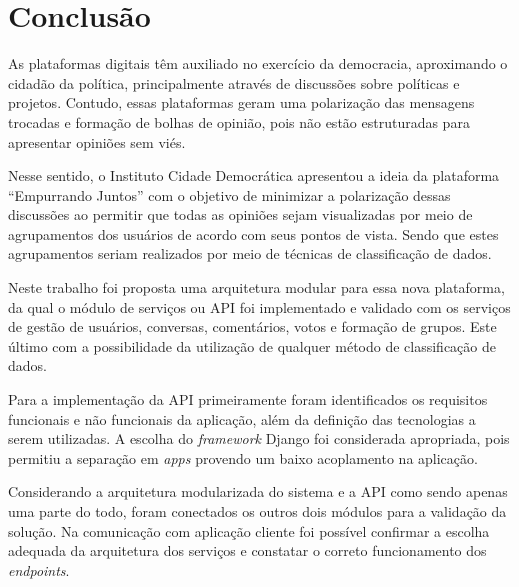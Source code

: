 \chapter{Conclusão} \label{cap:consideracoes_finais}

  As plataformas digitais têm auxiliado no exercício da democracia, aproximando o cidadão da política, principalmente
  através de discussões sobre políticas e projetos. Contudo,
  essas plataformas geram uma polarização das mensagens trocadas e formação de bolhas de opinião, 
  pois não estão estruturadas para apresentar opiniões sem viés.
  
  Nesse sentido, o Instituto Cidade Democrática apresentou a ideia da plataforma ``Empurrando Juntos'' com o objetivo
  de minimizar a polarização dessas discussões ao permitir que todas as opiniões sejam visualizadas por meio de agrupamentos
  dos usuários de acordo com seus pontos de vista. Sendo que estes agrupamentos seriam realizados por meio de técnicas 
  de classificação de dados.

  Neste trabalho foi proposta uma arquitetura modular para essa nova plataforma, da qual o módulo de serviços ou API
  foi implementado e validado com os serviços de gestão de usuários, 
  conversas, comentários, votos e formação de grupos. Este último com a possibilidade da utilização de qualquer método 
  de classificação de dados.
  
  Para a implementação da API primeiramente foram identificados os requisitos funcionais e não funcionais da aplicação, além
  da definição das tecnologias a serem utilizadas. A escolha do \textit{framework} Django foi considerada apropriada, pois permitiu
  a separação em \textit{apps} provendo um baixo acoplamento na aplicação. 
  
  
  Considerando a arquitetura modularizada do sistema e a API como sendo apenas uma parte do todo, 
  foram conectados os outros dois módulos para a validação 
  da solução. Na comunicação com aplicação cliente foi possível confirmar a escolha adequada da arquitetura dos serviços e 
  constatar o correto funcionamento dos \textit{endpoints}.
  
